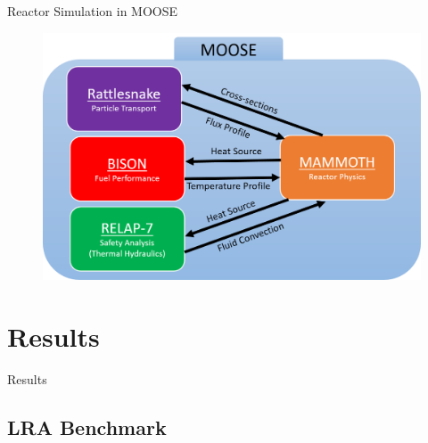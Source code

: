 \documentclass[8pt,xcolor=dvipnames]{beamer}
\begin{document}
\begin{frame}{Reactor Simulation in MOOSE}

\begin{figure}
\includegraphics[width=\linewidth]{figures/mammoth.png}
\end{figure}

\end{frame}

\section{Results}

\begin{frame}{Results}

\begin{multicols}{2}
\tableofcontents[currentsection]
\end{multicols}

\end{frame}

\subsection{LRA Benchmark}
\end{document}
